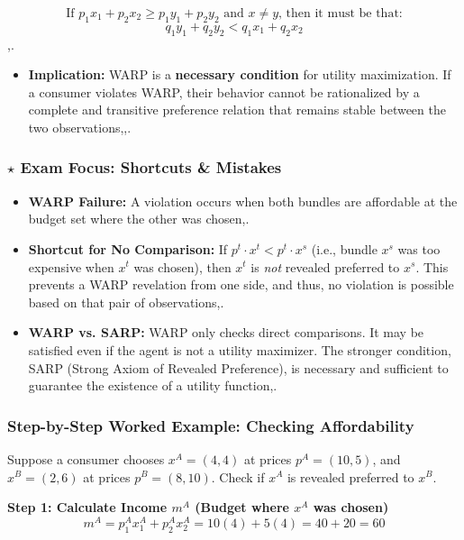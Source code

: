 \documentclass{article}
\begin{document}
\[\text{If } p_1 x_1 + p_2 x_2 \geq p_1 y_1 + p_2 y_2 \text{ and } x \neq y \text{, then it must be that:}\]
\[q_1 y_1 + q_2 y_2 < q_1 x_1 + q_2 x_2\],.

\begin{itemize}
    \item \textbf{Implication:} WARP is a \textbf{necessary condition} for utility maximization. If a consumer violates WARP, their behavior cannot be rationalized by a complete and transitive preference relation that remains stable between the two observations,,.
\end{itemize}

\subsubsection*{$\star$ Exam Focus: Shortcuts \& Mistakes}
\begin{itemize}
    \item \textbf{WARP Failure:} A violation occurs when both bundles are affordable at the budget set where the other was chosen,.
    \item \textbf{Shortcut for No Comparison:} If $p^t \cdot x^t < p^t \cdot x^s$ (i.e., bundle $x^s$ was too expensive when $x^t$ was chosen), then $x^t$ is \textit{not} revealed preferred to $x^s$. This prevents a WARP revelation from one side, and thus, no violation is possible based on that pair of observations,.
    \item \textbf{WARP vs. SARP:} WARP only checks direct comparisons. It may be satisfied even if the agent is not a utility maximizer. The stronger condition, SARP (Strong Axiom of Revealed Preference), is necessary and sufficient to guarantee the existence of a utility function,.
\end{itemize}

\hrulefill\vspace{2ex}

\subsubsection*{Step-by-Step Worked Example: Checking Affordability}

Suppose a consumer chooses $x^A=(4, 4)$ at prices $p^A=(10, 5)$, and $x^B=(2, 6)$ at prices $p^B=(8, 10)$. Check if $x^A$ is revealed preferred to $x^B$.

\textbf{Step 1: Calculate Income $m^A$ (Budget where $x^A$ was chosen)}
\[ m^A = p_1^A x_1^A + p_2^A x_2^A = 10(4) + 5(4) = 40 + 20 = 60 \]
\end{document}
